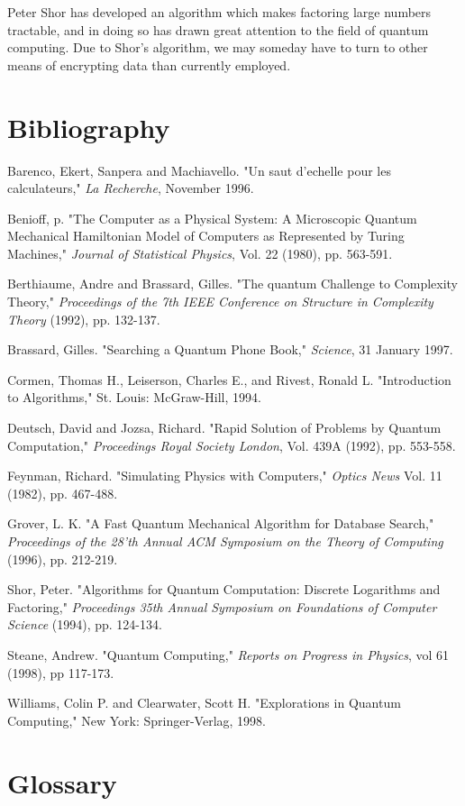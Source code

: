 \documentclass[]{article}
\begin{document}
Peter Shor has developed an algorithm which makes factoring large
numbers tractable, and in doing so has drawn great attention to the
field of quantum computing. Due to Shor's algorithm, we may someday
have to turn to other means of encrypting data than currently
employed.

\section{Bibliography}

Barenco, Ekert, Sanpera and Machiavello. "Un saut d'echelle pour les
calculateurs," \emph{La Recherche}, November 1996.

Benioff, p. "The Computer as a Physical System: A Microscopic Quantum
Mechanical Hamiltonian Model of Computers as Represented by Turing
Machines," \emph{Journal of Statistical Physics}, Vol. 22 (1980),
pp. 563-591.

Berthiaume, Andre and Brassard, Gilles. "The quantum Challenge to
Complexity Theory," \emph{Proceedings of the 7th IEEE Conference on
Structure in Complexity Theory} (1992), pp. 132-137.

Brassard, Gilles. "Searching a Quantum Phone Book," \emph{Science}, 31
January 1997.

Cormen, Thomas H., Leiserson, Charles E., and Rivest, Ronald L.
"Introduction to Algorithms," St. Louis: McGraw-Hill, 1994.

Deutsch, David and Jozsa, Richard. "Rapid Solution of Problems by
Quantum Computation," \emph{Proceedings Royal Society London}, Vol. 439A
(1992), pp. 553-558.

Feynman, Richard. "Simulating Physics with Computers," \emph{Optics News}
Vol. 11 (1982), pp. 467-488.

Grover, L. K. "A Fast Quantum Mechanical Algorithm for Database
Search," \emph{Proceedings of the 28'th Annual ACM Symposium on the Theory
of Computing} (1996), pp. 212-219.

Shor, Peter. "Algorithms for Quantum Computation: Discrete Logarithms
and Factoring," \emph{Proceedings 35th Annual Symposium on Foundations of
Computer Science} (1994), pp. 124-134.

Steane, Andrew. "Quantum Computing," \emph{Reports on Progress in Physics},
vol 61 (1998), pp 117-173.

Williams, Colin P. and Clearwater, Scott H. "Explorations in Quantum
Computing," New York: Springer-Verlag, 1998.

\section{Glossary}
\end{document}
